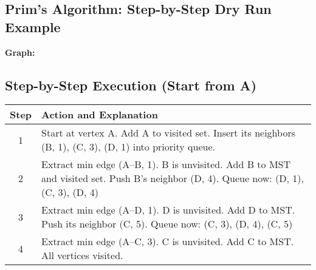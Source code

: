\documentclass[14pt,a4paper]{extarticle}
\begin{document}
\newpage
\subsection{Prim's Algorithm: Step-by-Step Dry Run Example}

\textbf{Graph:}


\begin{tcolorbox}[title=Directed Weighted Graph]

\end{tcolorbox}


\subsection*{Step-by-Step Execution (Start from A)}

\begin{longtable}{|c|p{8cm}|}
\hline
\textbf{Step} & \textbf{Action and Explanation} \\
\hline
1 & Start at vertex A. Add A to visited set. Insert its neighbors (B, 1), (C, 3), (D, 1) into priority queue. \\
\hline
2 & Extract min edge (A–B, 1). B is unvisited. Add B to MST and visited set. Push B’s neighbor (D, 4). Queue now: (D, 1), (C, 3), (D, 4) \\
\hline
3 & Extract min edge (A–D, 1). D is unvisited. Add D to MST. Push its neighbor (C, 5). Queue now: (C, 3), (D, 4), (C, 5) \\
\hline
4 & Extract min edge (A–C, 3). C is unvisited. Add C to MST. All vertices visited. \\
\hline
\end{longtable}
\end{document}
